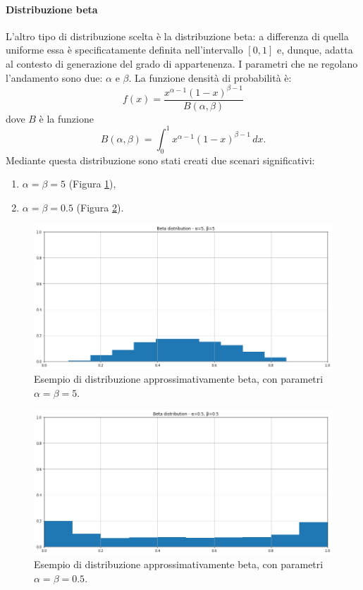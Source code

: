 \documentclass[12pt]{report}
\theoremstyle{definition}
\begin{document}
\paragraph{Distribuzione beta}
L'altro tipo di distribuzione scelta è la distribuzione beta: a differenza di quella uniforme essa è specificatamente definita nell'intervallo $[0,1]$ e, dunque, adatta al contesto di generazione del grado di appartenenza. I parametri che ne regolano l'andamento sono due: $\alpha$ e $\beta$. La funzione densità di probabilità è:
\begin{equation}
    f(x)= \frac{x^{\alpha - 1}(1-x)^{\beta - 1}}{B(\alpha, \beta)}
\end{equation}
dove $B$ è la funzione
\begin{equation}
    B(\alpha, \beta) = \int_{0}^{1} x^{\alpha - 1}(1-x)^{\beta - 1} \,dx.
\end{equation}
Mediante questa distribuzione sono stati creati due scenari significativi:
\begin{enumerate}
    \item $\alpha = \beta = 5$ (Figura \ref{beta5}),
    \item $\alpha = \beta = 0.5$ (Figura \ref{beta05}).
\end{enumerate}
\begin{figure}
    \centering
    \includegraphics[scale=0.4]{images/beta5.png}
    \caption{Esempio di distribuzione approssimativamente beta, con parametri $\alpha = \beta = 5$.}
    \label{beta5}
\end{figure}
\begin{figure}
    \centering
    \includegraphics[scale=0.4]{images/beta05.png}
    \caption{Esempio di distribuzione approssimativamente beta, con parametri $\alpha = \beta = 0.5$.}
    \label{beta05}
\end{figure}
\end{document}
